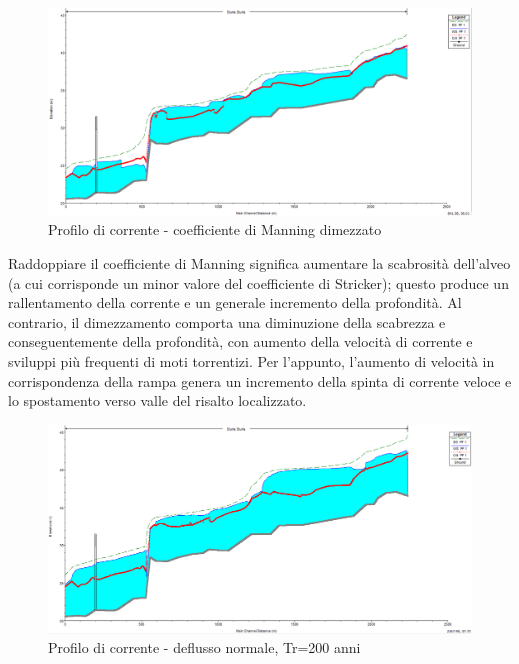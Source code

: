 \documentclass[12pt]{article} %
\begin{document}
\begin{figure}[H]
    \centering
    \includegraphics[scale=0.45]{Manning+05.PNG}
    \caption{Profilo di corrente - coefficiente di Manning dimezzato}
\end{figure}

\noindent Raddoppiare il coefficiente di Manning significa aumentare la scabrosità dell'alveo (a cui corrisponde un minor valore del coefficiente di Stricker); questo produce un rallentamento della corrente e un generale incremento della profondità.
Al contrario, il dimezzamento comporta una diminuzione della scabrezza e conseguentemente della profondità, con aumento della velocità di corrente e sviluppi più frequenti di moti torrentizi. Per l'appunto, l'aumento di velocità in corrispondenza della rampa genera un incremento della spinta di corrente veloce e lo spostamento verso valle del risalto localizzato.

\begin{figure}[H]
    \centering
    \includegraphics[scale=0.5]{ProfU839.PNG}
    \caption{Profilo di corrente - deflusso normale, Tr=200 anni}
    \label{fig:normale_200}
\end{figure}
\end{document}
